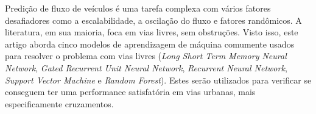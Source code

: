 

 Predição de fluxo de veículos é uma tarefa complexa com vários fatores desafiadores como a escalabilidade, a oscilação do fluxo e fatores randômicos. A literatura, em sua maioria, foca em vias livres, sem obstruções. Visto isso, este artigo aborda cinco modelos de aprendizagem de máquina comumente usados para resolver o problema com vias livres (\textit{Long Short Term Memory Neural Network}, \textit{Gated Recurrent Unit Neural Network}, \textit{Recurrent Neural Network}, \textit{Support Vector Machine} e \textit{Random Forest}). Estes serão utilizados para verificar se conseguem ter uma performance satisfatória em vias urbanas, mais especificamente cruzamentos.